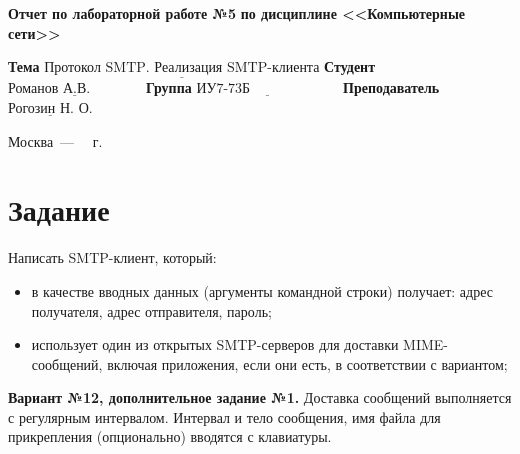 \documentclass[12pt]{report}
\begin{document}
\begin{titlepage}
		\begin{center}
			\noindent\begin{minipage}{1.1\textwidth}\centering
				\Large\textbf{  Отчет по лабораторной работе №5}\newline
				\textbf{по дисциплине <<Компьютерные сети>>}\newline\newline\newline
			\end{minipage}
		\end{center}
		
		\noindent\textbf{Тема} $\underline{\text{Протокол SMTP. Реализация SMTP-клиента}}$\newline\newline
		\noindent\textbf{Студент} $\underline{\text{Романов А.В.~~~~~~~~~~~}}$\newline\newline
		\noindent\textbf{Группа} $\underline{\text{ИУ7-73Б~~~~~~~~~~~~~~~~~~~}}$\newline\newline
		\noindent\textbf{Преподаватель} $\underline{\text{Рогозин Н. О.}}$\newline\newline\newline
		
		\begin{center}
			\vfill
			Москва~---~\the\year
			~г.
		\end{center}
	\end{titlepage}


\section*{Задание}

Написать SMTP-клиент, который:

\begin{itemize}
	\item в качестве вводных данных (аргументы командной строки) получает: адрес получателя, адрес отправителя, пароль;
	\item использует один из открытых SMTP-серверов для доставки MIME-сообщений, включая приложения, если они есть, в соответствии с вариантом;
\end{itemize}

\textbf{Вариант №12, дополнительное задание №1.} Доставка сообщений выполняется с регулярным интервалом. Интервал и тело сообщения, имя файла для прикрепления (опционально) вводятся с клавиатуры.
\end{document}

